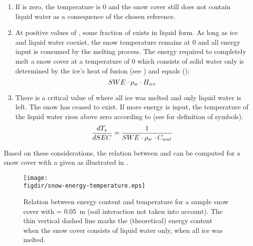 \begin{enumerate}
  \item If \snowEnergyContent{} is zero, the temperature is 0\celsius{} and the snow cover still does not contain liquid water as a consequence of the chosen reference.

  \item At positive values of \snowEnergyContent{}, some fraction of \snowWaterEquivalent{} exists in liquid form. As long as ice and liquid water coexist, the snow temperature remains at 0\celsius{} and all energy input is consumed by the melting process. The energy required to completely melt a snow cover at a temperature of 0\celsius{} which consists of solid water only is determined by the ice's heat of fusion (see ) and equals ():
  \begin{equation} \label{eqn:snow-enBal_melting-of-ice}
    SWE \cdot \rho_{w} \cdot H_{ice}
  \end{equation}

  \item There is a critical value of \snowEnergyContent{} where all ice was melted and only liquid water is left. The snow has ceased to exist. If more energy is input, the temperature of the liquid water rises above zero according to  (see  for definition of symbols).
  \begin{equation} \label{eqn:snow-enBal_heating-of-water}
    \frac{dT_s}{dSEC} = \frac{1}{SWE \cdot \rho_{w} \cdot C_{wat}}
  \end{equation}
\end{enumerate}

Based on these considerations, the relation between \snowEnergyContent{} and \snowTemperature{} can be computed for a snow cover with a given \snowWaterEquivalent{} as illustrated in .

\begin{figure}[htb]
  \centering
  \texttt{[image: \\figdir/snow-energy-temperature.eps]}
  \caption[Relation between energy content and temperature for a sample snow cover.]{Relation between energy content and temperature for a sample snow cover with \snowWaterEquivalent= 0.05~m (soil interaction not taken into account). The thin vertical dashed line marks the (theoretical) energy content when the snow cover consists of liquid water only, \ie{} when all ice was melted. \label{fig:snow-enBal_energy-temperature-relation}}
\end{figure}

